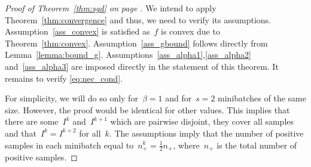 \sgd*
\begin{proof}[Proof of Theorem~\ref{thm:sgd} on page \pageref{thm:sgd}]
  We intend to apply Theorem~\ref{thm:convergence} and thus, we need to verify its assumptions. Assumption~\ref{ass_convex} is satisfied as~$f$ is convex due to Theorem~\ref{thm:convex}. Assumption~\ref{ass_gbound} follows directly from Lemma~\ref{lemma:bound_g}. Assumptions~\ref{ass_alpha1},\ref{ass_alpha2} and~\ref{ass_alpha3} are imposed directly in the statement of this theorem. It remains to verify \eqref{eq:nec_cond}.

  For simplicity, we will do so only for~$\beta=1$ and for~$s=2$ minibatches of the same size. However, the proof would be identical for other values. This implies that there are some~$I^k$ and~$I^{k+1}$ which are pairwise disjoint, they cover all samples and that~$I^k=I^{k+2}$ for all~$k$. The assumptions imply that the number of positive samples in each minibatch equal to~$n_+^k=\frac{1}{2}n_+$, where~$n_+$ is the total number of positive samples.


\end{proof}
